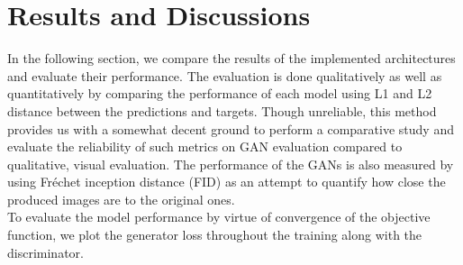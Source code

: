 \documentclass[10pt,twocolumn,letterpaper]{article}
\begin{document}
\section{Results and Discussions}
    \hspace*{0.167 in}In the following section, we compare the results of the implemented architectures and evaluate their performance. The evaluation is done qualitatively as well as quantitatively by comparing the performance of each model using L1 and L2 distance between the predictions and targets. Though unreliable, this method provides us with a somewhat decent ground to perform a comparative study and evaluate the reliability of such metrics on GAN evaluation compared to qualitative, visual evaluation. The performance of the GANs is also measured by using Fréchet inception distance (FID) as an attempt to quantify how close the produced images are to the original ones.\\
    \hspace*{0.167 in}To evaluate the model performance by virtue of convergence of the objective function, we plot the generator loss throughout the training along with the discriminator.\\
\end{document}
